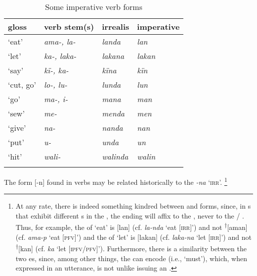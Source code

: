 \begin{table}
\caption{Some imperative verb forms}
\label{tab:4.11}
\begin{tabularx}{\textwidth}{QQQQ}
\lsptoprule
gloss & verb stem(s) & irrealis & imperative\\
\midrule
‘eat’ & {\itshape ama-, la-} & {\itshape landa} & {\itshape lan}\\
‘let’ & {\itshape ka-, laka-} & {\itshape lakana} & {\itshape lakan}\\
‘say’ & {\itshape kï-, ka-} & {\itshape kïna} & {\itshape kïn}\\
‘cut, go’ & {\itshape lo-, lu-} & {\itshape lunda} & {\itshape lun}\\
‘go’ & {\itshape ma-, i-} & {\itshape mana} & {\itshape man}\\
‘sew’ & {\itshape me-} & {\itshape menda} & {\itshape men}\\
‘give’ & {\itshape na-} & {\itshape nanda} & {\itshape nan}\\
‘put’ & {\itshape u-} & {\itshape unda} & {\itshape un}\\
‘hit’ & {\itshape wali-} & {\itshape walinda} & {\itshape walin}\\
\lspbottomrule
\end{tabularx}
\end{table}

The form [-n] found in  verbs may be related historically to the   \textit{-na} ‘\textsc{irr}’. \footnote{At any rate, there is indeed something kindred between  and  forms, since, in s that exhibit different s in the  , the  ending will affix to the  , never to the / . Thus, for example, the  of ‘eat’ is [lan] (cf. \textit{la-nda} ‘eat [\textsc{irr}]’) and not \textsuperscript{†}[aman] (cf. \textit{ama-p} ‘eat [\textsc{pfv}]’) and the  of ‘let’ is [lakan] (cf. \textit{laka-na} ‘let [\textsc{irr}]’) and not \textsuperscript{†}[kan] (cf. \textit{ka} ‘let [\textsc{ipfv/pfv}]’). Furthermore, there is a  similarity between the two es, since, among other things, the   can encode   (i.e., ‘must’), which, when expressed in an utterance, is not unlike issuing an .}


